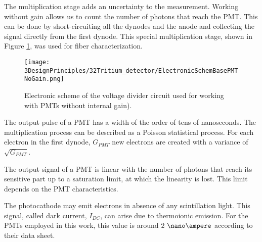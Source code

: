 \begin{enumerate}
The multiplication stage adds an uncertainty to the measurement. Working without gain allows us to count the number of photons that reach the PMT. This can be done by short-circuiting all the dynodes and the anode and collecting the signal directly from the first dynode. This special multiplication stage, shown in Figure \ref{fig:ElectronicSchemeBasePMTNoGain}, was used for fiber characterization.

\begin{figure}[htbp]
\centering
\texttt{[image: 3DesignPrinciples/32Tritium\_detector/ElectronicSchemBasePMTNoGain.png]}
\caption{Electronic scheme of the voltage divider circuit used for working with PMTs without internal gain).\label{fig:ElectronicSchemeBasePMTNoGain}}
\end{figure}


\end{enumerate}

The output pulse of a PMT has a width of the order of tens of nanoseconds. The multiplication process can be described as a Poisson statistical process. For each electron in the first dynode, $G_{PMT}$ new electrons are created with a variance of $\sqrt{G_{PMT}}$.

The output signal of a PMT is linear with the number of photons that reach its sensitive part up to a saturation limit, at which the linearity is lost. This limit depends on the PMT characteristics.

The photocathode may emit electrons in absence of any scintillation light. This signal, called dark current, $I_{DC}$, can  arise due to thermoionic emission. For the PMTs employed in this work, this value is around $2~\nano\ampere$ according to their data sheet.

